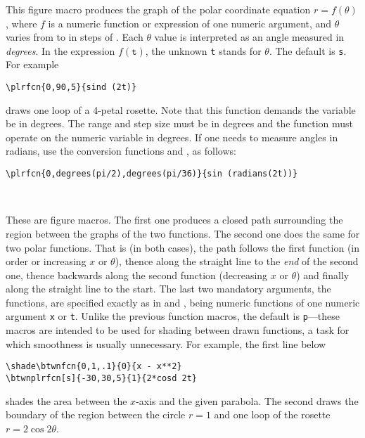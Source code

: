\documentclass[letterpaper]{article}
\begin{document}
This figure macro produces the graph of the polar coordinate equation
$r=f(\theta)$, where $f$ is a \MF{} numeric function or expression of
one numeric argument, and $\theta$ varies from
 to  in
steps of \meta{$\Delta\theta$}. Each $\theta$ value is interpreted as an
angle measured in \emph{degrees}. In the expression $f(\mathtt{t})$, the
unknown \texttt{t} stands for $\theta$. The default  is
\texttt{s}. For example
\begin{verbatim}
\plrfcn{0,90,5}{sind (2t)}
\end{verbatim}
draws one loop of a 4-petal rosette. Note that this function demands the
variable  be in degrees. The range and step size must be in
degrees and the function must operate on the numeric variable  in
degrees. If one needs to measure angles in radians, use the conversion
functions  and , as follows:
\begin{verbatim}
\plrfcn{0,degrees(pi/2),degrees(pi/36)}{sin (radians(2t))}
\end{verbatim}


\begin{cd}
%
    \\
%
%
\end{cd}

These are figure macros. The first one produces a closed path
surrounding the region between the graphs of the two functions. The
second one does the same for two polar functions. That is (in both
cases), the path follows the first function (in order or increasing $x$
or $\theta$), thence along the straight line to the \emph{end} of the
second one, thence backwards along the second function (decreasing $x$
or $\theta$) and finally along the straight line to the start. The last
two mandatory arguments, the functions, are specified exactly as in
 and , being numeric functions of one numeric
argument \texttt{x} or \texttt{t}. Unlike the previous function macros,
the default  is \texttt{p}---these macros are intended to be
used for shading between drawn functions, a task for which smoothness is
usually unnecessary. For example, the first line below
\begin{verbatim}
\shade\btwnfcn{0,1,.1}{0}{x - x**2}
\btwnplrfcn[s]{-30,30,5}{1}{2*cosd 2t}
\end{verbatim}
shades the area between the $x$-axis and the given parabola. The second
draws the boundary of the region between the circle $r = 1$ and one loop
of the rosette $r = 2\cos 2\theta$.
\end{document}
